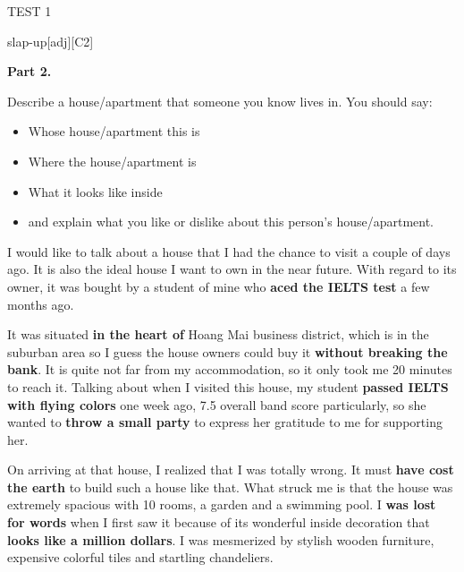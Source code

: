 \begin{glossarymc}[Cambridge 11]
\begin{test}{TEST 1}
\begin{VocabExplain}[Part 1]
            \begin{ExplainCard}{slap-up}[adj][C2]
            \end{ExplainCard}
        \end{VocabExplain}

    \noindent
        \textbf{Part 2.}
    \begin{qa}{Describe a house/apartment that someone you know lives in. You should say:}
    \begin{itemize}
        \item Whose house/apartment this is
        \item Where the house/apartment is
        \item What it looks like inside
        \item and explain what you like or dislike about this person’s house/apartment.
    \end{itemize}

    I would like to talk about a house that I had the chance to visit a couple of days ago. It is also the ideal house I want to own in the near future. With regard to its owner, it was bought by a student of mine who \textbf{aced the IELTS test} a few months ago.  

    It was situated \textbf{in the heart of} Hoang Mai business district, which is in the suburban area so I guess the house owners could buy it \textbf{without breaking the bank}. It is quite not far from my accommodation, so it only took me 20 minutes to reach it. Talking about when I visited this house, my student \textbf{passed IELTS with flying colors} one week ago, 7.5 overall band score particularly, so she wanted to \textbf{throw a small party} to express her gratitude to me for supporting her.  

    On arriving at that house, I realized that I was totally wrong. It must \textbf{have cost the earth} to build such a house like that. What struck me is that the house was extremely spacious with 10 rooms, a garden and a swimming pool. I \textbf{was lost for words} when I first saw it because of its wonderful inside decoration that \textbf{looks like a million dollars}. I was mesmerized by stylish wooden furniture, expensive colorful tiles and startling chandeliers.  


\end{qa}
\end{test}
\end{glossarymc}
